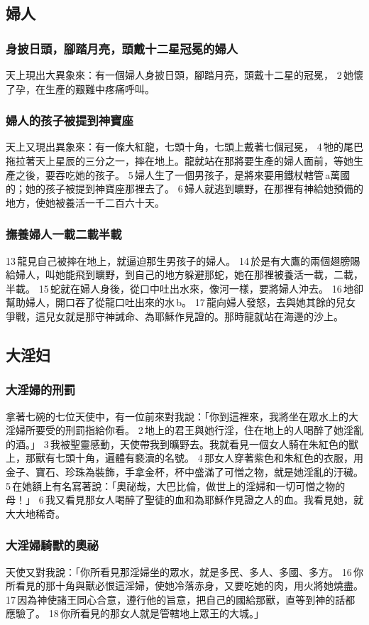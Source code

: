 \subsection{婦人}
\subsubsection{身披日頭，腳踏月亮，頭戴十二星冠冕的婦人}
天上現出大異象來：有一個婦人身披日頭，腳踏月亮，頭戴十二星的冠冕， 2 她懷了孕，在生產的艱難中疼痛呼叫。
\subsubsection{婦人的孩子被提到神寶座}
天上又現出異象來：有一條大紅龍，七頭十角，七頭上戴著七個冠冕， 4 牠的尾巴拖拉著天上星辰的三分之一，摔在地上。龍就站在那將要生產的婦人面前，等她生產之後，要吞吃她的孩子。 5 婦人生了一個男孩子，是將來要用鐵杖轄管 a萬國的；她的孩子被提到神寶座那裡去了。 6 婦人就逃到曠野，在那裡有神給她預備的地方，使她被養活一千二百六十天。

\subsubsection{撫養婦人一載二載半載}

13 龍見自己被摔在地上，就逼迫那生男孩子的婦人。 14 於是有大鷹的兩個翅膀賜給婦人，叫她能飛到曠野，到自己的地方躲避那蛇，她在那裡被養活一載，二載，半載。 15 蛇就在婦人身後，從口中吐出水來，像河一樣，要將婦人沖去。 16 地卻幫助婦人，開口吞了從龍口吐出來的水 b。 17 龍向婦人發怒，去與她其餘的兒女爭戰，這兒女就是那守神誡命、為耶穌作見證的。那時龍就站在海邊的沙上。

\subsection{大淫妇}
\subsubsection{大淫婦的刑罰 }
拿著七碗的七位天使中，有一位前來對我說：「你到這裡來，我將坐在眾水上的大淫婦所要受的刑罰指給你看。 2 地上的君王與她行淫，住在地上的人喝醉了她淫亂的酒。」 3 我被聖靈感動，天使帶我到曠野去。我就看見一個女人騎在朱紅色的獸上，那獸有七頭十角，遍體有褻瀆的名號。 4 那女人穿著紫色和朱紅色的衣服，用金子、寶石、珍珠為裝飾，手拿金杯，杯中盛滿了可憎之物，就是她淫亂的汙穢。 5 在她額上有名寫著說：「奧祕哉，大巴比倫，做世上的淫婦和一切可憎之物的母！」 6 我又看見那女人喝醉了聖徒的血和為耶穌作見證之人的血。我看見她，就大大地稀奇。
\subsubsection{大淫婦騎獸的奧祕}
天使又對我說：「你所看見那淫婦坐的眾水，就是多民、多人、多國、多方。 16 你所看見的那十角與獸必恨這淫婦，使她冷落赤身，又要吃她的肉，用火將她燒盡。 17 因為神使諸王同心合意，遵行他的旨意，把自己的國給那獸，直等到神的話都應驗了。 18 你所看見的那女人就是管轄地上眾王的大城。」


